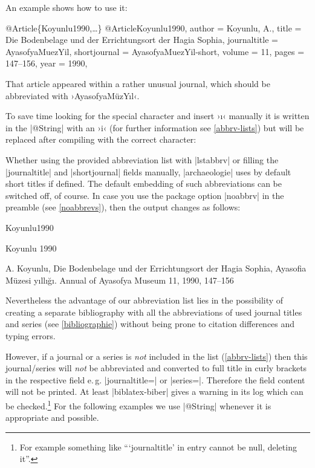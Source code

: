 \documentclass[a4paper,
10pt,
greek,
french,
spanish,
italian,
ngerman,
english,
]{ltxdoc}
\begin{document}
An example shows how to use it:

\begin{bibexample}[label=Koyunlu1990]{{@}Article\{Koyunlu1990,…\}}
@Article{Koyunlu1990,
  author       = {Koyunlu, A.},
  title        = {Die Bodenbelage und der Errichtungsort der Hagia Sophia},
  journaltitle = AyasofyaMuezYil,  %
  shortjournal = AyasofyaMuezYil-short,  %
  volume       = {11},
  pages        = {147--156},
  year         = {1990},
}
\end{bibexample}


That article appeared within a rather unusual journal, 
which should be abbreviated with ›AyasofyaMüzYıl‹.

To save  time  looking for the special character and insert ›ı‹ manually 
it is written in the |@String| with an ›i‹ (for further information see \cref{abbrv-lists}) but will be replaced after compiling with the correct character:



Whether using the provided abbreviation list with |lstabbrv| or filling the |journaltitle| and |shortjournal| fields manually, 
|archaeologie| uses by default short titles if defined.
The default embedding of such abbreviations can be switched off, of course.
In case you use the package option |noabbrv| in the preamble (see \cref{noabbrevs}), then the output changes as follows:
\begin{bibbox}{Koyunlu1990}\footnotesize
\parbox[t]{2cm}{Koyunlu 1990} \parbox[t]{9cm}{A. Koyunlu, 
Die Bodenbelage und der Errichtungsort der Hagia Sophia, {\color{red}Ayasofia Müzesi yıllığı. Annual of Ayasofya Museum} 11, 1990, 147–156}
\end{bibbox}
Nevertheless the advantage of our abbreviation list lies in the possibility of creating a separate bibliography 
with all the abbreviations of used journal titles and series (see \cref{bibliographie}) without being prone to citation differences and typing errors.

However, if a journal or a series is \emph{not} included in the list (\cref{abbrv-lists}) 
then this journal/series will \emph{not} be abbreviated and converted to full title in curly brackets in the respective field e.\,g. |journaltitle=| or |series=|. 
Therefore the field content will not be printed. 
At least |biblatex-biber| gives a warning in its log which can be checked.\footnote{For example something like \enquote{\enquote{journaltitle} in entry  cannot be null, deleting it}.}
For the following examples we use |@String| whenever it is appropriate and possible.
\end{document}
